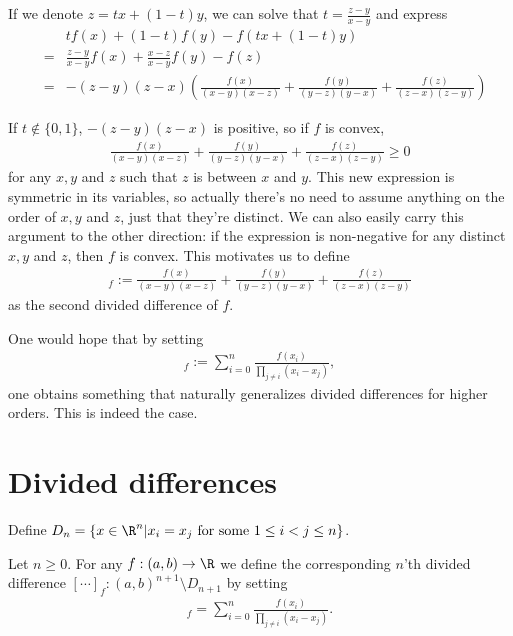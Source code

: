 If we denote $z = t x + (1 - t) y$, we can solve that $t = \frac{z - y}{x - y}$ and express
\begin{eqnarray*}
	&& t f(x) + (1 - t) f(y) - f(t x + (1 - t)y) \\
	&=& \frac{z - y}{x - y} f(x) + \frac{x - z}{x - y} f(y) - f(z) \\
	&=& -(z - y)(z - x) \left(\frac{f(x)}{(x - y)(x - z)} + \frac{f(y)}{(y - z)(y - x)} + \frac{f(z)}{(z - x)(z - y)} \right)
\end{eqnarray*}

If $t \notin \{0, 1\}$, $-(z - y)(z - x)$ is positive, so if $f$ is convex,
\begin{align*}
	\frac{f(x)}{(x - y)(x - z)} + \frac{f(y)}{(y - z)(y - x)} + \frac{f(z)}{(z - x)(z - y)} \geq 0
\end{align*}
for any $x, y$ and $z$ such that $z$ is between $x$ and $y$. This new expression is symmetric in its variables, so actually there's no need to assume anything on the order of $x, y$ and $z$, just that they're distinct. We can also easily carry this argument to the other direction: if the expression is non-negative for any distinct $x, y$ and $z$, then $f$ is convex. This motivates us to define
\begin{align*}
	[x, y, z]_{f} := \frac{f(x)}{(x - y)(x - z)} + \frac{f(y)}{(y - z)(y - x)} + \frac{f(z)}{(z - x)(z - y)}
\end{align*}
as the second divided difference of $f$.

One would hope that by setting
\begin{align*}
	[x_{0}, x_{1}, \ldots, x_{n}]_{f} := \sum_{i = 0}^{n} \frac{f(x_{i})}{\prod_{j \neq i} (x_{i} - x_{j})},
\end{align*}
one obtains something that naturally generalizes divided differences for higher orders. This is indeed the case.

\section{Divided differences}

Define $D_{n} = \{x\in \R^{n} | x_{i} = x_{j} \text{ for some $1 \leq i < j \leq n$}\}$.
\begin{maar}
Let $n \geq 0$. For any $f : (a, b) \to \R$ we define the corresponding $n$'th divided difference $[\cdots]_{f} : (a, b)^{n + 1} \setminus D_{n + 1}$ by setting
\begin{align*}
	[x_{0}, x_{1}, \ldots, x_{n}]_{f} = \sum_{i = 0}^{n} \frac{f(x_{i})}{\prod_{j \neq i} (x_{i} - x_{j})}.
\end{align*}
\end{maar}

